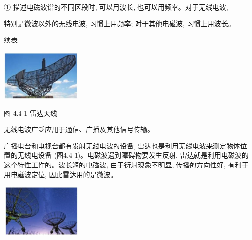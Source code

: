 \documentclass[10pt]{article}
\begin{document}
① 描述电磁波谱的不同区段时, 可以用波长, 也可以用频率。对于无线电波,

特别是微波以外的无线电波, 习惯上用频率; 对于其他电磁波, 习惯上用波长。

续表

\begin{center}
\end{center}

\begin{center}
\includegraphics[max width=0.3\textwidth]{images/01910e72-c5b7-7ed5-a6d4-fb3a5faefc32_89_129548.jpg}
\end{center}

图 4.4-1 雷达天线

无线电波广泛应用于通信、广播及其他信号传输。

广播电台和电视台都有发射无线电波的设备, 雷达也是利用无线电波来测定物体位置的无线电设备 (图4.4-1)。电磁波遇到障碍物要发生反射, 雷达就是利用电磁波的这个特性工作的。波长短的电磁波, 由于衍射现象不明显, 传播的方向性好, 有利于用电磁波定位, 因此雷达用的是微波。

\begin{center}
\includegraphics[max width=0.3\textwidth]{images/01910e72-c5b7-7ed5-a6d4-fb3a5faefc32_89_241984.jpg}
\end{center}
\end{document}
